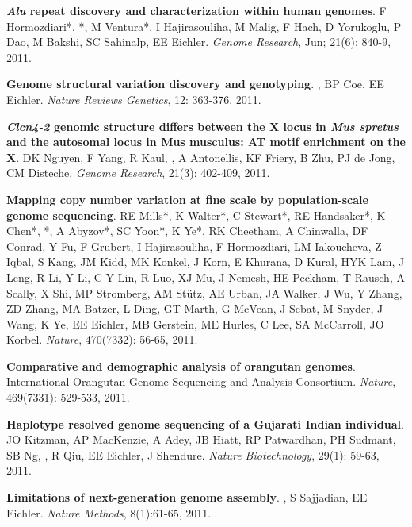 \vspace{-.2cm}
    {\bf \textit {Alu} repeat discovery and characterization within human genomes}.
    F Hormozdiari*, \calkan{}*, M Ventura*, I Hajirasouliha, M Malig, 
    F Hach, D Yorukoglu, P Dao, M Bakshi, SC Sahinalp, EE Eichler.
    {\em Genome Research}, Jun; 21(6): 840-9, 2011.

\vspace{-.2cm}
    {\bf Genome structural variation discovery and genotyping}. 
    \calkan{}, BP Coe, EE Eichler.
    {\em Nature Reviews Genetics}, 12: 363-376, 2011.
    
\vspace{-.2cm}
    {\bf {\em Clcn4-2} genomic structure differs between the X locus in \textit{Mus spretus} and the autosomal locus in Mus musculus: AT motif enrichment on the X}.  
    DK Nguyen, F Yang, R Kaul, \calkan{}, A Antonellis, KF Friery, 
    B Zhu, PJ de Jong, CM Disteche. {\em Genome Research}, 21(3): 402-409, 2011.
    
\vspace{-.2cm}
    {\bf Mapping copy number variation at fine scale by population-scale genome sequencing}.
    RE Mills*, K Walter*, C Stewart*, RE Handsaker*, K Chen*, 
    \calkan{}*, A Abyzov*, SC Yoon*, K Ye*, RK Cheetham, 
    A Chinwalla, DF Conrad, Y Fu, F Grubert, I Hajirasouliha, 
    F Hormozdiari, LM Iakoucheva, Z Iqbal, S Kang, JM Kidd, 
    MK Konkel, J Korn, E Khurana, D Kural, HYK Lam, J Leng, 
    R Li, Y Li, C-Y Lin, R Luo, XJ Mu, J Nemesh,
    HE Peckham, T Rausch, A Scally, X Shi, MP Stromberg, 
    AM St\"{u}tz, AE Urban, JA Walker, J Wu, Y Zhang, 
    ZD Zhang, MA Batzer, L Ding, GT Marth, G McVean, 
    J Sebat, M Snyder, J Wang, K Ye, EE Eichler, 
    MB Gerstein, ME Hurles, C Lee, SA McCarroll,  JO Korbel.
    {\em Nature}, 470(7332): 56-65, 2011.
    
\vspace{-.2cm}
    {\bf Comparative and demographic analysis of orangutan genomes}. 
    International Orangutan Genome Sequencing and Analysis Consortium.
    {\em Nature}, 469(7331): 529-533, 2011.
    

\vspace{-.2cm}
    {\bf Haplotype resolved genome sequencing of a Gujarati Indian individual}.
    JO Kitzman, AP MacKenzie, A Adey, JB Hiatt, RP Patwardhan, 
    PH Sudmant, SB Ng, \calkan{}, R Qiu, EE
    Eichler, J Shendure.
    {\em Nature Biotechnology}, 29(1): 59-63, 2011.
    
\vspace{-.2cm}
    {\bf Limitations of next-generation genome assembly}.
    \calkan{}, S Sajjadian, EE Eichler.
    {\em Nature Methods}, 8(1):61-65, 2011. \\
    
